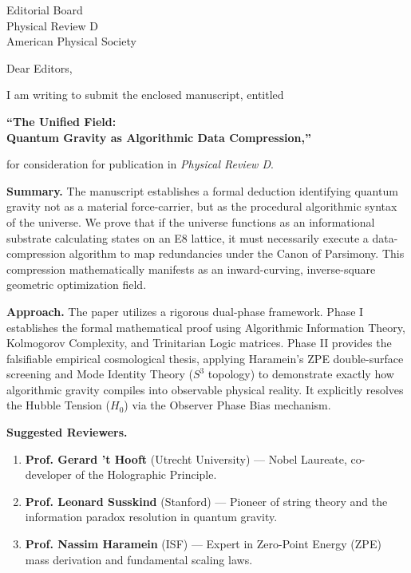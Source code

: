 \documentclass[12pt, a4paper]{letter}
\begin{document}
\begin{letter}{Editorial Board \\ Physical Review D \\ American Physical Society}

\opening{Dear Editors,}

I am writing to submit the enclosed manuscript, entitled

\begin{center}
\textbf{``The Unified Field: \\
Quantum Gravity as Algorithmic Data Compression,''}
\end{center}

\noindent for consideration for publication in \textit{Physical Review D}.

\medskip

\textbf{Summary.} The manuscript establishes a formal deduction identifying quantum gravity not as a material force-carrier, but as the procedural algorithmic syntax of the universe. We prove that if the universe functions as an informational substrate calculating states on an E8 lattice, it must necessarily execute a data-compression algorithm to map redundancies under the Canon of Parsimony. This compression mathematically manifests as an inward-curving, inverse-square geometric optimization field.

\medskip

\textbf{Approach.} The paper utilizes a rigorous dual-phase framework. Phase I establishes the formal mathematical proof using Algorithmic Information Theory, Kolmogorov Complexity, and Trinitarian Logic matrices. Phase II provides the falsifiable empirical cosmological thesis, applying Haramein's ZPE double-surface screening and Mode Identity Theory ($S^3$ topology) to demonstrate exactly how algorithmic gravity compiles into observable physical reality. It explicitly resolves the Hubble Tension ($H_0$) via the Observer Phase Bias mechanism.

\medskip

\textbf{Suggested Reviewers.}
\begin{enumerate}
  \item \textbf{Prof. Gerard 't Hooft} (Utrecht University) --- Nobel Laureate, co-developer of the Holographic Principle.
  \item \textbf{Prof. Leonard Susskind} (Stanford) --- Pioneer of string theory and the information paradox resolution in quantum gravity.
  \item \textbf{Prof. Nassim Haramein} (ISF) --- Expert in Zero-Point Energy (ZPE) mass derivation and fundamental scaling laws.
\end{enumerate}


\end{letter}
\end{document}
